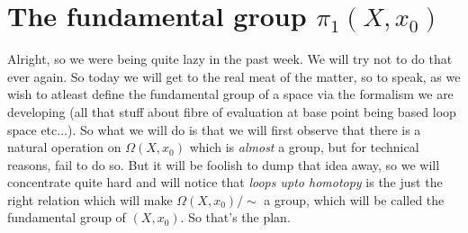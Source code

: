 \documentclass[letterpaper,11pt,twoside]{article}
\theoremstyle{definition}
\theoremstyle{definition}
\theoremstyle{definition}
\theoremstyle{definition}
\theoremstyle{definition}
\theoremstyle{definition}
\theoremstyle{remark}
\theoremstyle{definition}
\newcommand{\loops}[1]{\Omega\left(#1\right)}
\begin{document}
	\section{The fundamental group $\pi_1(X,x_0)$}
	Alright, so we were being quite lazy in the past week. We will try not to do that ever again. So today we will get to the real meat of the matter, so to speak, as we wish to atleast define the fundamental group of a space via the formalism we are developing (all that stuff about fibre of evaluation at base point being based loop space etc...). 
	So what we will do is that we will first observe that there is a natural operation on $\loops{X,x_0}$ which is \textit{almost} a group, but for technical reasons, fail to do so. But it will be foolish to dump that idea away, so we will concentrate quite hard and will notice that \textit{loops upto homotopy} is the just the right relation which will make $\loops{X,x_0}/\sim$ a group, which will be called the fundamental group of $(X,x_0)$. So that's the plan.
\end{document}
